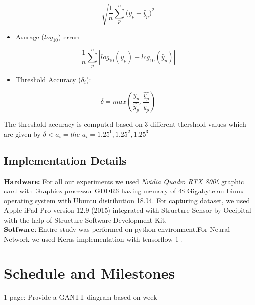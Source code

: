 \begin{equation} \label{RMSE}
        \sqrt{\frac{1}{n} \sum_{p}^{n}{(y_{p} - \hat{y}_{p}})^2}
\end{equation}

\begin{itemize}

    \item Average (${log_{10}}$) error: 
    
\end{itemize}{}

\begin{equation} \label{avg_log}
    \frac{1}{n} \sum_{p}^{n} \left|log_{10}(y_{p}) - log_{10}(\hat{y}_{p}) \right|
\end{equation}


\begin{itemize}
    \item Threshold Accuracy (\(\delta_{i}\)): 
\end{itemize}{}

\begin{equation} \label{ThresholdAcc}
    {\delta = max (\frac{{y_{p}}}{\hat{y_{p}}}, \frac{\hat{y_{p}}}{{y_{p}}})}
\end{equation}

The threshold accuracy is computed based on 3 different thershold values which are given by \(\delta < a_{i}= the\)  \(a_{i}= 1.25^1, 1.25^2, 1.25^3\)  






\subsection{Implementation Details}
\label{Chapter5:HardwarSoftwareDetails}
\textbf{Hardware:} For all our experiments we used \textit{Nvidia Quadro RTX 8000} graphic card with Graphics processor GDDR6  having memory of 48 Gigabyte on Linux operating system with Ubuntu distribution 18.04. For capturing dataset, we used Apple iPad Pro version 12.9 (2015) integrated with Structure Sensor by Occipital with the help of Structure Software Development Kit.\\


\textbf{Sotfware:} Entire study was performed on python environment.For Neural Network we used Keras implementation with tensorflow 1 \cite{tensorflow2015-whitepaper}.



\newpage








\section{Schedule and Milestones}
1 page: Provide a GANTT diagram based on week
